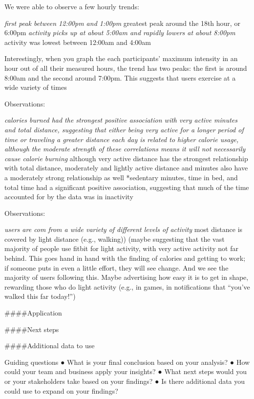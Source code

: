 \documentclass[
]{article}
\begin{document}
We were able to observe a few hourly trends:

\emph{first peak between 12:00pm and 1:00pm }greatest peak around the
18th hour, or 6:00pm \emph{activity picks up at about 5:00am and rapidly
lowers at about 8:00pm }activity was lowest between 12:00am and 4:00am

Interestingly, when you graph the each participants' maximum intensity
in an hour out of all their measured hours, the trend has two peaks: the
first is around 8:00am and the second around 7:00pm. This suggests that
users exercise at a wide variety of times

Observations:

\emph{calories burned had the strongest positive association with very
active minutes and total distance, suggesting that either being very
active for a longer period of time or traveling a greater distance each
day is related to higher calorie usage, although the moderate strength
of these correlations means it will not necessarily cause calorie
burning }although very active distance has the strongest relationship
with total distance, moderately and lightly active distance and minutes
also have a moderately strong relationship as well *sedentary minutes,
time in bed, and total time had a significant positive association,
suggesting that much of the time accounted for by the data was in
inactivity

Observations:

\emph{users are com from a wide variety of different levels of activity
}most distance is covered by light distance (e.g., walking)) (maybe
suggesting that the vast majority of people use fitbit for light
activity, with very active activity not far behind. This goes hand in
hand with the finding of calories and getting to work; if someone puts
in even a little effort, they will see change. And we see the majority
of users following this. Maybe advertising how easy it is to get in
shape, rewarding those who do light activity (e.g., in games, in
notifications that ``you've walked this far today!'')

\#\#\#\#Application

\#\#\#\#Next steps

\#\#\#\#Additional data to use

Guiding questions ● What is your final conclusion based on your
analysis? ● How could your team and business apply your insights? ● What
next steps would you or your stakeholders take based on your findings? ●
Is there additional data you could use to expand on your findings?
\end{document}

